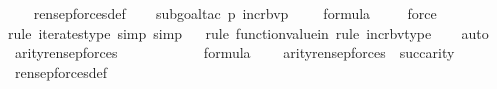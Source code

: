 \begin{isabellebody}
%
\isadelimproof
\ \ %
\endisadelimproof
%
\isatagproof
{}\isamarkupfalse%
\ ren{\isacharunderscore}{\kern0pt}sep{\isacharunderscore}{\kern0pt}forces{\isacharunderscore}{\kern0pt}def\ \isanewline
\ \ \isamarkupfalse%
{\isacharparenleft}{\kern0pt}subgoal{\isacharunderscore}{\kern0pt}tac\ {\isachardoublequoteopen}{\isacharparenleft}{\kern0pt}{\isasymlambda}p{\isachardot}{\kern0pt}\ incr{\isacharunderscore}{\kern0pt}bv{\isacharparenleft}{\kern0pt}p{\isacharparenright}{\kern0pt}\ {\isacharbackquote}{\kern0pt}\ {}{\isacharparenright}{\kern0pt}{\isacharcircum}{\kern0pt}{}\ {\isacharparenleft}{\kern0pt}{\isasymphi}{\isacharparenright}{\kern0pt}\ {\isasymin}\ formula{\isachardoublequoteclose}{\isacharparenright}{\kern0pt}\isanewline
\ \ \ \isamarkupfalse%
\ force\ \isanewline
\ \ \isamarkupfalse%
{\isacharparenleft}{\kern0pt}rule\ iterates{\isacharunderscore}{\kern0pt}type{\isacharcomma}{\kern0pt}\ simp{\isacharcomma}{\kern0pt}\ simp{\isacharparenright}{\kern0pt}\isanewline
\ \ \isamarkupfalse%
{\isacharparenleft}{\kern0pt}rule\ function{\isacharunderscore}{\kern0pt}value{\isacharunderscore}{\kern0pt}in{\isacharcomma}{\kern0pt}\ rule\ incr{\isacharunderscore}{\kern0pt}bv{\isacharunderscore}{\kern0pt}type{\isacharparenright}{\kern0pt}\isanewline
\ \ \isamarkupfalse%
\ auto%
\endisatagproof
{\isafoldproof}%
%
\isadelimproof
\isanewline
%
\endisadelimproof
\isanewline
{}\isamarkupfalse%
\ arity{\isacharunderscore}{\kern0pt}ren{\isacharunderscore}{\kern0pt}sep{\isacharunderscore}{\kern0pt}forces\ {\isacharcolon}{\kern0pt}\ \isanewline
\ \ \ {\isasymphi}\ \isanewline
\ \ \ {\isachardoublequoteopen}{\isasymphi}\ {\isasymin}\ formula{\isachardoublequoteclose}\ \isanewline
\ \ \ {\isachardoublequoteopen}arity{\isacharparenleft}{\kern0pt}ren{\isacharunderscore}{\kern0pt}sep{\isacharunderscore}{\kern0pt}forces{\isacharparenleft}{\kern0pt}{\isasymphi}{\isacharparenright}{\kern0pt}{\isacharparenright}{\kern0pt}\ {\isasymle}\ succ{\isacharparenleft}{\kern0pt}arity{\isacharparenleft}{\kern0pt}{\isasymphi}{\isacharparenright}{\kern0pt}{\isacharparenright}{\kern0pt}\ {\isasymunion}\ {}{\isachardoublequoteclose}\ \isanewline
%
\isadelimproof
\isanewline
\ \ %
\endisadelimproof
%
\isatagproof
{}\isamarkupfalse%
\ ren{\isacharunderscore}{\kern0pt}sep{\isacharunderscore}{\kern0pt}forces{\isacharunderscore}{\kern0pt}def\ \isanewline
\ \ \isamarkupfalse%

\end{isabellebody}

